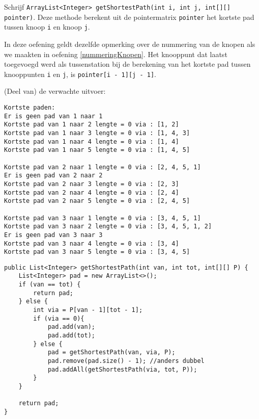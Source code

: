 \begin{oef}
\code Schrijf \verb/ArrayList<Integer> getShortestPath(int i, int j, int[][] pointer)/. Deze methode berekent uit de pointermatrix \verb/pointer/ het kortste pad tussen knoop \verb/i/ en knoop \verb/j/. 

In deze oefening geldt dezelfde opmerking over de nummering van de knopen als we maakten in oefening \ref{nummeringKnopen}. Het knooppunt dat laatst toegevoegd werd als tussenstation bij de berekening van het kortste pad tussen knooppunten \verb/i/ en \verb/j/, is \verb/pointer[i - 1][j - 1]/.

(Deel van) de verwachte uitvoer:
\begin{verbatim}
Kortste paden: 
Er is geen pad van 1 naar 1
Kortste pad van 1 naar 2 lengte = 0 via : [1, 2]
Kortste pad van 1 naar 3 lengte = 0 via : [1, 4, 3]
Kortste pad van 1 naar 4 lengte = 0 via : [1, 4]
Kortste pad van 1 naar 5 lengte = 0 via : [1, 4, 5]

Kortste pad van 2 naar 1 lengte = 0 via : [2, 4, 5, 1]
Er is geen pad van 2 naar 2
Kortste pad van 2 naar 3 lengte = 0 via : [2, 3]
Kortste pad van 2 naar 4 lengte = 0 via : [2, 4]
Kortste pad van 2 naar 5 lengte = 0 via : [2, 4, 5]

Kortste pad van 3 naar 1 lengte = 0 via : [3, 4, 5, 1]
Kortste pad van 3 naar 2 lengte = 0 via : [3, 4, 5, 1, 2]
Er is geen pad van 3 naar 3
Kortste pad van 3 naar 4 lengte = 0 via : [3, 4]
Kortste pad van 3 naar 5 lengte = 0 via : [3, 4, 5]
\end{verbatim}

\begin{opl}
\begin{lstlisting}[caption={getShortestPath}, label=FloydgetShortestPath]
public List<Integer> getShortestPath(int van, int tot, int[][] P) {
	List<Integer> pad = new ArrayList<>();
	if (van == tot) {
		return pad;
	} else {
		int via = P[van - 1][tot - 1];
		if (via == 0){
			pad.add(van);
			pad.add(tot);
		} else {
			pad = getShortestPath(van, via, P);
			pad.remove(pad.size() - 1); //anders dubbel
			pad.addAll(getShortestPath(via, tot, P));
		}
	}

	return pad;
}
\end{lstlisting}
\end{opl}
\end{oef}

